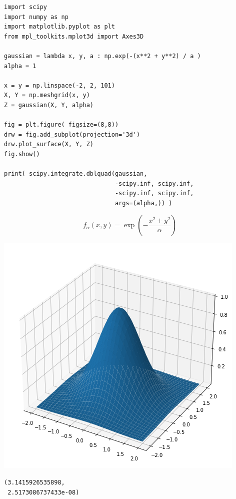 \begin{frame}[fragile]
%
\begin{minipage}[b]{.7\linewidth}
\begin{codebox}%
\begin{verbatim}
import scipy
import numpy as np
import matplotlib.pyplot as plt
from mpl_toolkits.mplot3d import Axes3D

gaussian = lambda x, y, a : np.exp(-(x**2 + y**2) / a )
alpha = 1

x = y = np.linspace(-2, 2, 101)
X, Y = np.meshgrid(x, y)
Z = gaussian(X, Y, alpha)

fig = plt.figure( figsize=(8,8))
drw = fig.add_subplot(projection='3d')
drw.plot_surface(X, Y, Z)
fig.show()

print( scipy.integrate.dblquad(gaussian,
                               -scipy.inf, scipy.inf,
                               -scipy.inf, scipy.inf,
                               args=(alpha,)) )
\end{verbatim}
\end{codebox}
\end{minipage}
%
\begin{minipage}[b]{.29\linewidth}
\[
	f_\alpha(x, y)
=
	\exp( -\frac
	{x^2 + y^2}
	{\alpha} )
\]
%
\begin{tcolorbox}[title=Output]%
	\includegraphics[width=\linewidth]{./gfx/gaussian-2D}
\end{tcolorbox}
%
\begin{cmdbox}[Output]%
\begin{verbatim}
(3.1415926535898,
 2.5173086737433e-08)
\end{verbatim}
\end{cmdbox}
\end{minipage}
%
\end{frame}

